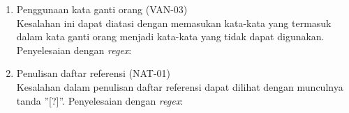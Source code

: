 \begin{enumerate}
	\item Penggunaan kata ganti orang (VAN-03) \\
	Kesalahan ini dapat diatasi dengan memasukan kata-kata yang termasuk dalam kata ganti orang menjadi kata-kata yang tidak dapat digunakan. \newline
	Penyelesaian dengan \textit{regex}:
	
	\item Penulisan daftar referensi (NAT-01) \\
	Kesalahan dalam penulisan daftar referensi dapat dilihat dengan munculnya tanda ''[?]''. \newline
	Penyelesaian dengan \textit{regex}:
	
\end{enumerate}